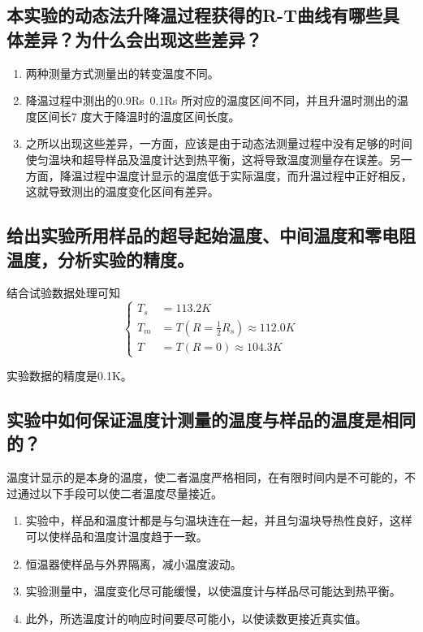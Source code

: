 \documentclass[a4paper]{article}
\begin{document}
\subsection{本实验的动态法升降温过程获得的R-T曲线有哪些具体差异？为什么会出现这些差异？}
\begin{enumerate}
\item 两种测量方式测量出的转变温度不同。
\item 降温过程中测出的0.9Rs~0.1Rs 所对应的温度区间不同，并且升温时测出的温度区间长7
度大于降温时的温度区间长度。
\item 之所以出现这些差异，一方面，应该是由于动态法测量过程中没有足够的时间使匀温块和超导样品及温度计达到热平衡，这将导致温度测量存在误差。另一方面，降温过程中温度计显示的温度低于实际温度，而升温过程中正好相反，这就导致测出的温度变化区间有差异。
\end{enumerate}
\subsection{给出实验所用样品的超导起始温度、中间温度和零电阻温度，分析实验的精度。}
结合试验数据处理可知
\begin{equation*}
\left\{ \begin{aligned}
T_s & = 113.2K\\
T_m & = T(R=\frac{1}{2}R_s) \approx 112.0K\\
T & = T(R=0) \approx 104.3K
\end{aligned} \right.
\end{equation*}

实验数据的精度是0.1K。
\subsection{实验中如何保证温度计测量的温度与样品的温度是相同的？}
温度计显示的是本身的温度，使二者温度严格相同，在有限时间内是不可能的，不过通过以下手段可以使二者温度尽量接近。
\begin{enumerate}
\item 实验中，样品和温度计都是与匀温块连在一起，并且匀温块导热性良好，这样可以使样品和温度计温度趋于一致。
\item 恒温器使样品与外界隔离，减小温度波动。
\item 实验测量中，温度变化尽可能缓慢，以使温度计与样品尽可能达到热平衡。
\item 此外，所选温度计的响应时间要尽可能小，以使读数更接近真实值。
\end{enumerate}

\nocite{jiaocai}

\end{document}
